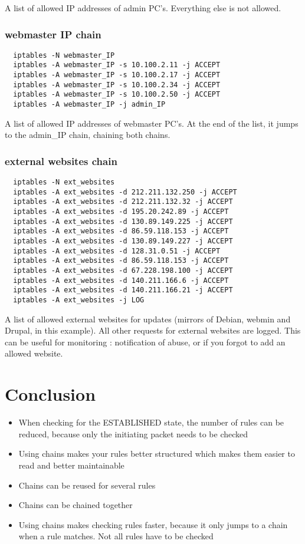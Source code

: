 \documentclass[a4paper,12pt]{article}
\begin{document}
A list of allowed IP addresses of admin PC's. Everything else is not allowed.

\subsubsection{webmaster IP chain}

\begin{verbatim}
  iptables -N webmaster_IP
  iptables -A webmaster_IP -s 10.100.2.11 -j ACCEPT
  iptables -A webmaster_IP -s 10.100.2.17 -j ACCEPT
  iptables -A webmaster_IP -s 10.100.2.34 -j ACCEPT
  iptables -A webmaster_IP -s 10.100.2.50 -j ACCEPT
  iptables -A webmaster_IP -j admin_IP
\end{verbatim}

A list of allowed IP addresses of webmaster PC's.
At the end of the list, it jumps to the admin\_IP chain, chaining both chains.


\subsubsection{external websites chain}

\begin{verbatim}
  iptables -N ext_websites
  iptables -A ext_websites -d 212.211.132.250 -j ACCEPT
  iptables -A ext_websites -d 212.211.132.32 -j ACCEPT
  iptables -A ext_websites -d 195.20.242.89 -j ACCEPT
  iptables -A ext_websites -d 130.89.149.225 -j ACCEPT
  iptables -A ext_websites -d 86.59.118.153 -j ACCEPT
  iptables -A ext_websites -d 130.89.149.227 -j ACCEPT
  iptables -A ext_websites -d 128.31.0.51 -j ACCEPT
  iptables -A ext_websites -d 86.59.118.153 -j ACCEPT
  iptables -A ext_websites -d 67.228.198.100 -j ACCEPT
  iptables -A ext_websites -d 140.211.166.6 -j ACCEPT
  iptables -A ext_websites -d 140.211.166.21 -j ACCEPT
  iptables -A ext_websites -j LOG
\end{verbatim}

A list of allowed external websites for updates (mirrors of Debian, webmin and Drupal, in this example).
All other requests for external websites are logged. This can be useful for monitoring : notification of abuse, or if you forgot to add an allowed website.

\section{Conclusion}
\begin{itemize}
  \item When checking for the ESTABLISHED state, the number of rules can be reduced, because only the initiating packet needs to be checked
  \item Using chains makes your rules better structured which makes them easier to read and better maintainable
  \item Chains can be reused for several rules
  \item Chains can be chained together
  \item Using chains makes checking rules faster, because it only jumps to a chain when a rule matches. Not all rules have to be checked
\end{itemize}
\end{document}
